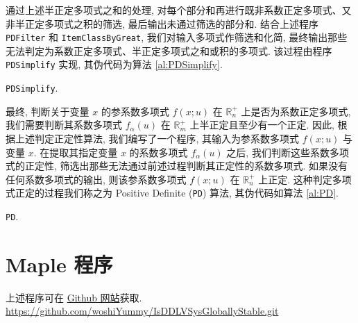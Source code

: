 \documentclass[10pt,a4paper]{ctexart}
\begin{document}
通过上述半正定多项式之和的处理, 对每个部分和再进行既非系数正定多项式、又非半正定多项式之积的筛选, 最后输出未通过筛选的部分和. 结合上述程序 \texttt{PDFilter} 和 \texttt{ItemClassByGreat}, 我们对输入多项式作筛选和化简, 最终输出那些无法判定为系数正定多项式、半正定多项式之和或积的多项式. 该过程由程序 \texttt{PDSimplify} 实现, 其伪代码为算法 \ref{al:PDSimplify}.
\begin{algorithm}[!ht]
  \caption{\texttt{PDSimplify}.}\label{al:PDSimplify}
\end{algorithm}

最终, 判断关于变量 $x$ 的参系数多项式 $f(x;u)$ 在 $\mathbb{R}_n^+$ 上是否为系数正定多项式, 我们需要判断其系数多项式 $f_\alpha(u)$ 在 $\mathbb{R}_m^+$ 上半正定且至少有一个正定. 因此, 根据上述判定正定性算法, 我们编写了一个程序, 其输入为参系数多项式 $f(x;u)$ 与变量 $x$. 在提取其指定变量 $x$ 的系数多项式 $f_\alpha(u)$ 之后, 我们判断这些系数多项式的正定性, 筛选出那些无法通过前述过程判断其正定性的系数多项式. 如果没有任何系数多项式的输出, 则该参系数多项式 $f(x;u)$ 在 $\mathbb{R}_n^+$ 上正定. 这种判定多项式正定的过程我们称之为 Positive Definite (\texttt{PD}) 算法, 其伪代码如算法 \ref{al:PD}.
\begin{algorithm}[!ht]
  \caption{\texttt{PD}.}\label{al:PD}
\end{algorithm}

\appendix

\section{Maple 程序}

上述程序可在 \href{https://github.com/woshiYummy/IsDDLVSysGloballyStable.git}{Github 网站}获取.\\
\url{https://github.com/woshiYummy/IsDDLVSysGloballyStable.git}
\end{document}
